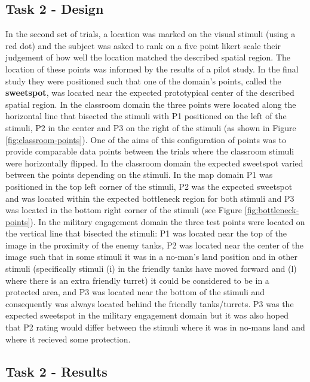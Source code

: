 \documentclass[11pt,letterpaper]{article}
\begin{document}
\subsection{Task 2 - Design} 
In the second set of trials, a location was marked on the visual stimuli (using a red dot) and the subject was asked to rank on a five point likert scale their judgement of how well the location matched the described spatial region.  The location of these points was informed by the results of a pilot study. In the final study they were positioned such that one of the domain's points, called the \textbf{sweetspot}, was located near the expected prototypical center of the described spatial region. In the classroom domain the three points were located along the horizontal line that bisected the stimuli with P1 positioned on the left of the stimuli, P2 in the center and P3 on the right of the stimuli (as shown in Figure \ref{fig:classroom-points}). One of the aims of this configuration of points was to provide comparable data points between the trials where the classroom stimuli were horizontally flipped. In the classroom domain the expected sweetspot varied between the points depending on the stimuli. In the map domain P1 was positioned in the top left corner of the stimuli,  P2 was the expected sweetspot and was located within the expected bottleneck region for both stimuli and P3 was located in the bottom right corner of the stimuli (see Figure \ref{fig:bottleneck-points}).  In the military engagement domain the three test points were located on the vertical line that bisected the stimuli: P1 was located near the top of the image in the proximity of the enemy tanks, P2 was located near the center of the image such that in some stimuli it was in a no-man's land position and in other stimuli (specifically stimuli (i) in the friendly tanks have moved forward and (l) where there is an extra friendly turret) it could be considered to be in a protected area, and P3 was located near the bottom of the stimuli and consequently was always located behind the friendly tanks/turrets. P3 was the expected sweetspot in the military engagement domain but it was also hoped that P2 rating would differ between the stimuli where it was in no-mans land and where it recieved some protection. 


\subsection{Task 2 - Results}
\end{document}
